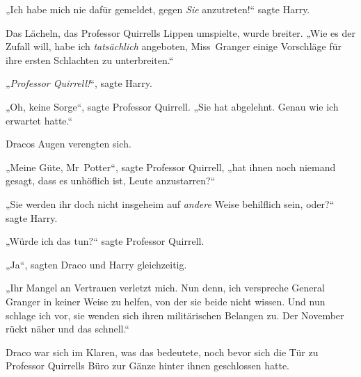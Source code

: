 „Ich habe mich nie dafür gemeldet, gegen \emph{Sie} anzutreten!“ sagte Harry.

Das Lächeln, das Professor Quirrells Lippen umspielte, wurde breiter.
„Wie es der Zufall will, habe ich \emph{tatsächlich} angeboten, Miss~Granger einige Vorschläge für ihre ersten Schlachten zu unterbreiten.“

„\emph{Professor Quirrell!}“, sagte Harry.

„Oh, keine Sorge“, sagte Professor Quirrell.
„Sie hat abgelehnt. Genau wie ich erwartet hatte.“

Dracos Augen verengten sich.

„Meine Güte, Mr~Potter“, sagte Professor Quirrell, „hat ihnen noch niemand gesagt, dass es unhöflich ist, Leute anzustarren?“

„Sie werden ihr doch nicht insgeheim auf \emph{andere} Weise behilflich sein, oder?“ sagte Harry.

„Würde ich das tun?“ sagte Professor Quirrell.

„Ja“, sagten Draco und Harry gleichzeitig.

„Ihr Mangel an Vertrauen verletzt mich. Nun denn, ich verspreche General Granger in keiner Weise zu helfen, von der sie beide nicht wissen. Und nun schlage ich vor, sie wenden sich ihren militärischen Belangen zu. Der November rückt näher und das schnell.“

\later

Draco war sich im Klaren, was das bedeutete, noch bevor sich die Tür zu Professor Quirrells Büro zur Gänze hinter ihnen geschlossen hatte.

